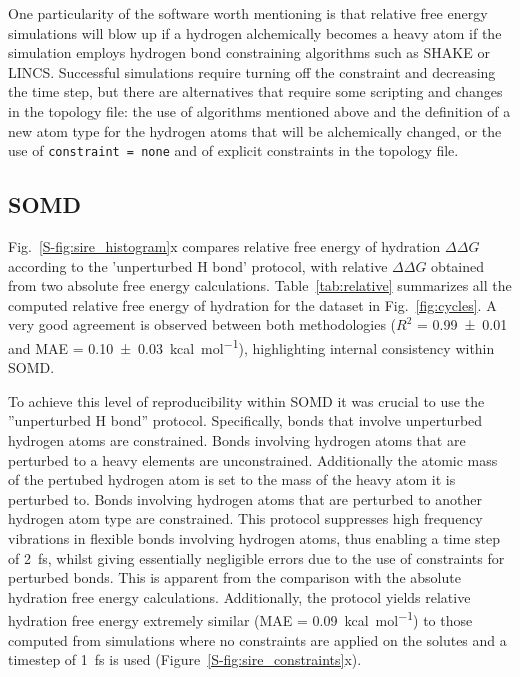 \documentclass[journal=jctcce,manuscript=article]{achemso}
\newcommand{\inpopt}[1]{\texttt{#1}}
\begin{document}
One particularity of the software worth mentioning is that relative free energy 
simulations will blow up if a hydrogen alchemically becomes a heavy atom if the 
simulation employs hydrogen bond constraining algorithms such as SHAKE or LINCS.
Successful simulations require turning off the constraint and decreasing 
the time step, but there are alternatives that require some scripting and 
changes in the topology file: the use of algorithms mentioned above and the 
definition of a new atom type for the hydrogen atoms that will be alchemically 
changed, or the use of \inpopt{constraint = none} and of explicit constraints 
in the topology file.

\subsection{SOMD}
\label{sec:somd-results}

Fig.~\ref{S-fig:sire_histogram}x compares relative free energy of hydration 
$\Delta\Delta G$ according to the 'unperturbed H bond' protocol, with relative 
$\Delta \Delta G$ obtained from two absolute free energy calculations. 
Table~\ref{tab:relative} summarizes all the computed relative free energy of 
hydration for the dataset in Fig.~\ref{fig:cycles}.
A very good agreement is observed between both methodologies 
($R^2$ = \num{0.99+-0.01} and MAE = \SI{0.10+-0.03}{kcal.mol^{-1}}), 
highlighting internal consistency within SOMD.

To achieve this level of reproducibility within SOMD it was crucial to use the
''unperturbed H bond'' protocol. Specifically, bonds that involve unperturbed 
hydrogen atoms are constrained. Bonds involving hydrogen atoms that are 
perturbed to a heavy elements are unconstrained.  Additionally the atomic mass 
of the pertubed hydrogen atom is set to the mass of the heavy atom it is 
perturbed to.  Bonds involving hydrogen atoms that are perturbed to another 
hydrogen atom type are constrained. This protocol suppresses high frequency 
vibrations in flexible bonds involving hydrogen atoms, thus enabling a time 
step of \SI{2}{fs}, whilst giving essentially negligible errors due to the use 
of constraints for perturbed bonds.  This is apparent from the comparison with 
the absolute hydration free energy calculations.  Additionally, the protocol 
yields relative hydration free energy extremely similar  (MAE = 
\SI{0.09}{kcal.mol^{-1}}) to those computed from simulations where no
constraints are applied on the solutes and a timestep of \SI{1}{fs} is
used (Figure~\ref{S-fig:sire_constraints}x).
\end{document}
